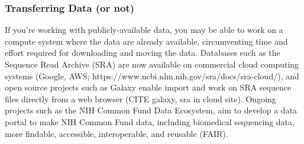 \documentclass[10pt,letterpaper]{article}
\begin{document}
\begin{table}
\caption{\label{tab:computational_resources} \textbf{Research cloud resources} Cloud provider indicates the name of the cloud, standard model indicates the most common route toward using the cloud, and limitations indicates limitations in access or services provided by the cloud.}
\end{table}


\subsubsection*{Transferring Data (or not)} 

If you're working with publicly-available data, you may be able to work on a compute system where the data are already available, circumventing time and effort required for downloading and moving the data.
Databases such as the Sequence Read Archive (SRA) are now available on commercial cloud computing systems (Google, AWS; https://www.ncbi.nlm.nih.gov/sra/docs/sra-cloud/), and open source projects such as Galaxy enable import and work on SRA sequence files directly from a web browser (CITE galaxy, sra in cloud site). Ongoing projects such as the NIH Common Fund Data Ecosystem, aim to develop a data portal to make NIH Common Fund data, including biomedical sequencing data, more findable,
accessible, interoperable, and reusable (FAIR). 
\end{document}
